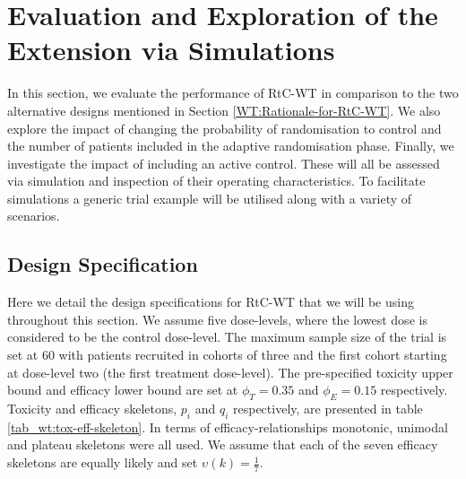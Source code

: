  \section{Evaluation and Exploration of the Extension via Simulations}
 \label{WT:Evaluation-of-the-Extension}
 
 In this section, we evaluate the performance of RtC-WT in comparison to the two alternative designs mentioned in Section \ref{WT:Rationale-for-RtC-WT}. We also explore the impact of changing the probability of randomisation to control and the number of patients included in the adaptive randomisation phase. Finally, we investigate the impact of including an active control. These will all be assessed via simulation and inspection of their operating characteristics. To facilitate simulations a generic trial example will be utilised along with a variety of scenarios. 
 
 \subsection{Design Specification}
 \label{WT:Design-Spec}
 
 Here we detail the design specifications for RtC-WT that we will be using throughout this section. We assume five dose-levels, where the lowest dose is considered to be the control dose-level. The maximum sample size of the trial is set at 60 with patients recruited in cohorts of three and the first cohort starting at dose-level two (the first treatment dose-level). The pre-specified toxicity upper bound and efficacy lower bound are set at $\phi_T = 0.35$ and $\phi_E = 0.15$ respectively. Toxicity and efficacy skeletons, $p_i$ and $q_i$ respectively, are presented in table \ref{tab_wt:tox-eff-skeleton}. In terms of efficacy-relationships monotonic, unimodal and plateau skeletons were all used. We assume that each of the seven efficacy skeletons are equally likely and set $\upsilon(k) = \frac{1}{7}$. 
 

